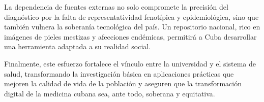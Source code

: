 La dependencia de fuentes externas no solo compromete la precisión del diagnóstico por la falta de 
representatividad fenotípica y epidemiológica, sino que también vulnera la soberanía tecnológica del país. 
Un repositorio nacional, rico en imágenes de pieles mestizas y afecciones endémicas, permitirá a Cuba 
desarrollar una herramienta adaptada a su realidad social.

Finalmente, este esfuerzo fortalece el vínculo entre la universidad y el sistema de salud, transformando 
la investigación básica en aplicaciones prácticas que mejoren la calidad de vida de la población y 
aseguren que la transformación digital de la medicina cubana sea, ante todo, soberana y equitativa.

